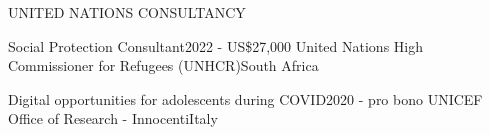 \begin{rSection}{UNITED NATIONS CONSULTANCY}

\begin{rSubsection}
{Social Protection Consultant}{2022 - US\$27,000}
{United Nations High Commissioner for Refugees (UNHCR)}{South Africa}\par
\end{rSubsection}

\begin{rSubsection}
{Digital opportunities for adolescents during COVID}{2020 - pro bono}
{UNICEF Office of Research - Innocenti}{Italy}\par
\end{rSubsection}

\end{rSection}